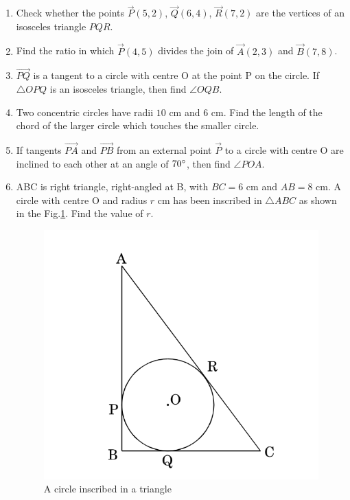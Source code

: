 \documentclass{article}
\begin{document}
\begin{enumerate}
\item Check whether the points $\vec{P}(5, 2)$, $\vec{Q}(6, 4)$, $\vec{R}(7, 2)$ are the vertices of an isosceles triangle $PQR$.

\item Find the ratio in which $\vec{P}(4, 5)$ divides the join of $\vec{A}(2, 3)$ and $\vec{B}(7, 8)$. 
	
\item $\vec{PQ}$ is a tangent to a circle with centre O at the point P on the circle. If $\triangle OPQ$ is an isosceles triangle, then find $\angle OQB$. 

\item Two concentric circles have radii $10$ cm and $6$ cm. Find the length of the chord of the larger circle which touches the smaller circle. 

\item If tangents $\vec{PA}$ and $\vec{PB}$ from an external point $\vec{P}$ to a circle with centre O are inclined to each other at an angle of $70\degree$, then find $\angle POA$. 

\item ABC is right triangle, right-angled at B, with $BC = 6$ cm and $AB = 8$ cm. A circle with centre O and radius $r$ cm has been inscribed in $\triangle ABC$ as shown in the Fig.\ref{fig:4}. Find the value of $r$. 
	\begin{figure}[h]
	\centering
	\includegraphics[width=\columnwidth]{figs/3.jpg}
	\caption{A circle inscribed in a triangle}
	\label{fig:4}
	\end{figure}
	

\end{enumerate}
\end{document}
